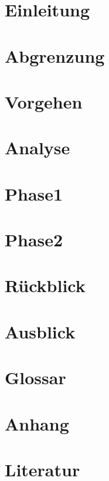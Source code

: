 











\part{Einleitung}




\part{Abgrenzung}


\part{Vorgehen}


\part{Analyse}


\part{Phase1}


\part{Phase2}


\part{Rückblick}


\part{Ausblick}


\part{Glossar}


\part{Anhang}


\part{Literatur}



